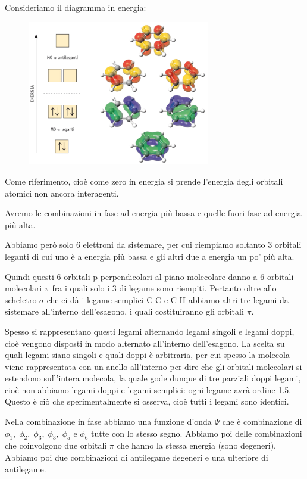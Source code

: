Consideriamo il diagramma in energia:

\begin{figure}[htp]
    \centering
    \includegraphics[width=8cm]{immagini/orbitali_molecolari_benzene.png}
\end{figure}

Come riferimento, cioè come zero in energia si prende l'energia degli orbitali atomici non ancora interagenti.

Avremo le combinazioni in fase ad energia più bassa e quelle fuori fase ad energia più alta.
        
Abbiamo però solo 6 elettroni da sistemare, per cui riempiamo soltanto 3 orbitali leganti di cui uno è a energia più bassa e gli altri due a energia un po' più alta. 
    
Quindi questi 6 orbitali p perpendicolari al piano molecolare danno a 6 orbitali molecolari $\pi$ fra i quali solo i 3 di legame sono riempiti. Pertanto oltre allo scheletro $\sigma$ che ci dà i legame semplici C-C e C-H abbiamo altri tre legami da sistemare all'interno dell'esagono, i quali costituiranno gli orbitali $\pi$.
    
Spesso si rappresentano questi legami alternando legami singoli e legami doppi, cioè vengono disposti in modo alternato all'interno dell'esagono. La scelta su quali legami siano singoli e quali doppi è arbitraria, per cui spesso la molecola viene rappresentata con un anello all'interno per dire che gli orbitali molecolari si estendono sull'intera molecola, la quale gode dunque di tre parziali doppi legami, cioè non abbiamo legami doppi e legami semplici: ogni legame avrà ordine 1.5. Questo è ciò che sperimentalmente si osserva, cioè tutti i legami sono identici.

Nella combinazione in fase abbiamo una funzione d'onda $\Psi$ che è combinazione di  $\phi_1 , \; \phi_2 , \; \phi_3 , \; \phi_3 , \; \phi_5$ e $\phi_6$ tutte con lo stesso segno. Abbiamo poi delle combinazioni che coinvolgono due orbitali $\pi$ che hanno la stessa energia (sono degeneri). Abbiamo poi due combinazioni di antilegame degeneri e una ulteriore di antilegame.

